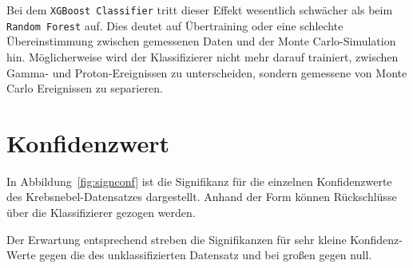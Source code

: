 Bei dem \texttt{XGBoost Classifier} tritt dieser Effekt wesentlich schwächer als beim \texttt{Random Forest} auf. 
Dies deutet auf Übertraining oder eine schlechte Übereinstimmung zwischen gemessenen Daten und der Monte Carlo-Simulation hin.
Möglicherweise wird der Klassifizierer nicht mehr darauf trainiert, zwischen Gamma- und Proton-Ereignissen zu unterscheiden, sondern gemessene von Monte Carlo Ereignissen zu separieren.

\section{Konfidenzwert}
\label{sec:konf}
In Abbildung~\ref{fig:signconf} ist die Signifikanz für die einzelnen Konfidenzwerte des Krebsnebel-Datensatzes dargestellt. 
Anhand der Form können Rückschlüsse über die Klassifizierer gezogen werden. 

Der Erwartung entsprechend streben die Signifikanzen für sehr kleine Konfidenz-Werte gegen die des unklassifizierten Datensatz und bei großen gegen null.

